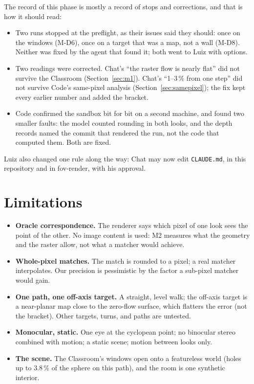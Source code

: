 \documentclass[11pt,a4paper]{article}
\newcommand{\code}[1]{\texttt{\small #1}}
\begin{document}
The record of this phase is mostly a record of stops and corrections, and that is how it should read:
\begin{itemize}
\item Two runs stopped at the preflight, as their issues said they should: once on the windows (M-D6), once on a target
  that was a map, not a wall (M-D8). Neither was fixed by the agent that found it; both went to Luiz with options.
\item Two readings were corrected. Chat's ``the raster flow is nearly flat'' did not survive the Classroom
  (Section~\ref{sec:m1}). Chat's ``1--3\,\% from one step'' did not survive Code's same-pixel analysis
  (Section~\ref{sec:samepixel}); the fix kept every earlier number and added the bracket.
\item Code confirmed the sandbox bit for bit on a second machine, and found two smaller faults: the model counted rounding
  in both looks, and the depth records named the commit that rendered the run, not the code that computed them. Both are
  fixed.
\end{itemize}
Luiz also changed one rule along the way: Chat may now edit \code{CLAUDE.md}, in this repository and in fov-render, with
his approval.

\section{Limitations}\label{sec:limits}

\begin{itemize}
\item \textbf{Oracle correspondence.} The renderer says which pixel of one look sees the point of the other. No image
  content is used: M2 measures what the geometry and the raster allow, not what a matcher would achieve.
\item \textbf{Whole-pixel matches.} The match is rounded to a pixel; a real matcher interpolates. Our precision is
  pessimistic by the factor a sub-pixel matcher would gain.
\item \textbf{One path, one off-axis target.} A straight, level walk; the off-axis target is a near-planar map close to
  the zero-flow surface, which flatters the error (not the bracket). Other targets, turns, and paths are untested.
\item \textbf{Monocular, static.} One eye at the cyclopean point; no binocular stereo combined with motion; a static
  scene; motion between looks only.
\item \textbf{The scene.} The Classroom's windows open onto a featureless world (holes up to 3.8\,\% of the sphere on this
  path), and the room is one synthetic interior.
\end{itemize}
\end{document}
